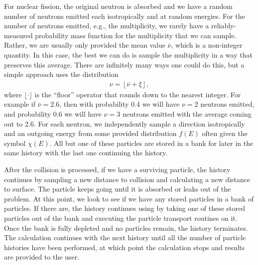 For nuclear fission, the original neutron is absorbed and we have a random number of neutrons emitted each isotropically and at random energies. For the number of neutrons emitted, e.g., the multiplicity, we rarely have a reliably-measured probability mass function for the multiplicity that we can sample. Rather, we are usually only provided the mean value $\overline{\nu}$, which is a non-integer quantity. In this case, the best we can do is sample the multiplicity in a way that preserves this average. There are infinitely many ways one could do this, but a simple approach uses the distribution
\begin{align}
  \nu  = \left\lfloor \overline{\nu} + \xi \right\rfloor ,
\end{align}
where $\lfloor \cdot \rfloor$ is the ``floor'' operator that rounds down to the nearest integer. For example if $\overline{\nu} = 2.6$, then with probability 0.4 we will have $\nu = 2$ neutrons emitted, and probability 0.6 we will have $\nu = 3$ neutrons emitted with the average coming out to 2.6. For each neutron, we independently sample a direction isotropically and an outgoing energy from some provided distribution $f(E)$ often given the symbol $\chi(E)$. All but one of these particles are stored in a bank for later in the same history with the last one continuing the history.

After the collision is processed, if we have a surviving particle, the history continues by sampling a new distance to collision and calculating a new distance to surface. The particle keeps going until it is absorbed or leaks out of the problem. At this point, we look to see if we have any stored particles in a bank of particles. If there are, the history continues using by taking one of these stored particles out of the bank and executing the particle transport routines on it. Once the bank is fully depleted and no particles remain, the history terminates. The calculation continues with the next history until all the number of particle histories have been performed, at which point the calculation stops and results are provided to the user.

